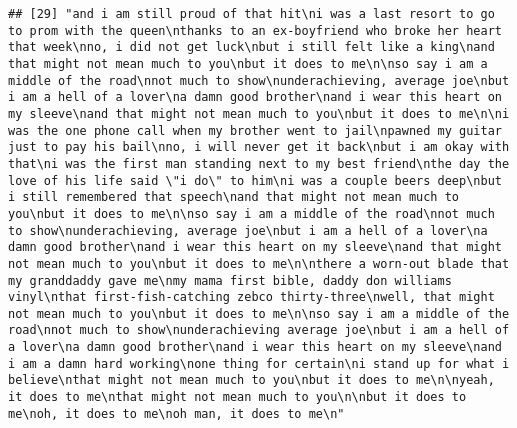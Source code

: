 \documentclass[]{article}
\begin{document}
\begin{verbatim}
## [29] "and i am still proud of that hit\ni was a last resort to go to prom with the queen\nthanks to an ex-boyfriend who broke her heart that week\nno, i did not get luck\nbut i still felt like a king\nand that might not mean much to you\nbut it does to me\n\nso say i am a middle of the road\nnot much to show\nunderachieving, average joe\nbut i am a hell of a lover\na damn good brother\nand i wear this heart on my sleeve\nand that might not mean much to you\nbut it does to me\n\ni was the one phone call when my brother went to jail\npawned my guitar just to pay his bail\nno, i will never get it back\nbut i am okay with that\ni was the first man standing next to my best friend\nthe day the love of his life said \"i do\" to him\ni was a couple beers deep\nbut i still remembered that speech\nand that might not mean much to you\nbut it does to me\n\nso say i am a middle of the road\nnot much to show\nunderachieving, average joe\nbut i am a hell of a lover\na damn good brother\nand i wear this heart on my sleeve\nand that might not mean much to you\nbut it does to me\n\nthere a worn-out blade that my granddaddy gave me\nmy mama first bible, daddy don williams vinyl\nthat first-fish-catching zebco thirty-three\nwell, that might not mean much to you\nbut it does to me\n\nso say i am a middle of the road\nnot much to show\nunderachieving average joe\nbut i am a hell of a lover\na damn good brother\nand i wear this heart on my sleeve\nand i am a damn hard working\none thing for certain\ni stand up for what i believe\nthat might not mean much to you\nbut it does to me\n\nyeah, it does to me\nthat might not mean much to you\n\nbut it does to me\noh, it does to me\noh man, it does to me\n"                                                                                                                                                                                                                                                                                                                                                                                                                                                                                                                                                                                                                                                                                                                                                                                                                                                                                                                                                                                                                                                                                                                                                                                                               

\end{verbatim}
\end{document}
